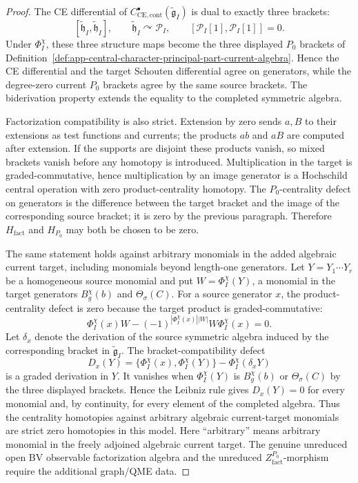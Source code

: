 \begin{proof}
  The CE differential of
  \(C^\bullet_{\mathrm{CE},\mathrm{cont}}(\widetilde{\mathfrak g}_I)\)
  is dual to exactly three brackets:
  \[
    [\widetilde{\mathfrak h}_I,\widetilde{\mathfrak h}_I],
    \qquad
    \widetilde{\mathfrak h}_I\curvearrowright\mathcal P_I,
    \qquad
    [\mathcal P_I[1],\mathcal P_I[1]]=0 .
  \]
  Under \(\Phi_I^\chi\), these three structure maps become the three
  displayed \(P_0\) brackets of
  Definition~\ref{def:app-central-character-principal-part-current-algebra}.
  Hence the CE differential and the target Schouten differential agree
  on generators, while the degree-zero current \(P_0\) brackets agree
  by the same source brackets.  The biderivation property extends the
  equality to the completed symmetric algebra.

  Factorization compatibility is also strict.  Extension by zero sends
  \(a,B\) to their extensions as test functions and currents; the
  products \(ab\) and \(aB\) are computed after extension.  If the
  supports are disjoint these products vanish, so mixed brackets vanish
  before any homotopy is introduced.  Multiplication in the target is
  graded-commutative, hence multiplication by an image generator is a
  Hochschild central operation with zero product-centrality homotopy.
  The \(P_0\)-centrality defect on generators is the difference between
  the target bracket and the image of the corresponding source bracket;
  it is zero by the previous paragraph.  Therefore
  \(H_{\mathrm{fact}}\) and \(H_{P_0}\) may both be chosen to be zero.

  The same statement holds against arbitrary monomials in the added
  algebraic current target, including monomials beyond length-one
  generators.  Let
  \(Y=Y_1\cdots Y_r\) be a homogeneous source monomial and put
  \(W=\Phi_I^\chi(Y)\), a monomial in the target generators
  \(B_g^\chi(b)\) and \(\Theta_\sigma(C)\).  For a source generator
  \(x\), the product-centrality defect is zero because the target
  product is graded-commutative:
  \[
    \Phi_I^\chi(x)W-(-1)^{|\Phi_I^\chi(x)||W|}W\Phi_I^\chi(x)=0 .
  \]
  Let \(\delta_x\) denote the derivation of the source symmetric
  algebra induced by the corresponding bracket in
  \(\widetilde{\mathfrak g}_I\).  The bracket-compatibility defect
  \[
    D_x(Y)=\{\Phi_I^\chi(x),\Phi_I^\chi(Y)\}
      -\Phi_I^\chi(\delta_xY)
  \]
  is a graded derivation in \(Y\).  It vanishes when \(\Phi_I^\chi(Y)\)
  is \(B_g^\chi(b)\) or \(\Theta_\sigma(C)\) by the three
  displayed brackets.  Hence the Leibniz rule gives \(D_x(Y)=0\) for
  every monomial and, by continuity, for every element of the completed
  algebra.  Thus the centrality homotopies against arbitrary algebraic
  current-target monomials are strict zero homotopies in this model.
  Here ``arbitrary'' means arbitrary monomial in the freely adjoined
  algebraic current target.  The genuine unreduced open BV observable
  factorization algebra and the unreduced
  \(Z^{P_0}_{\mathrm{fact}}\)-morphism require the additional graph/QME data.
\end{proof}

